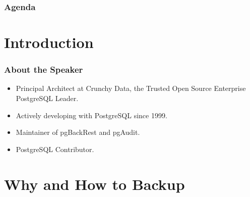 %
\def\mytitle{Backup Best Practices\\with pgBackRest}
\def\mysubject{}
\def\myevent{PGConf.Online 2021}
\def\myauthor{David Steele}
\def\myemail{}
\def\mydate{March 1, 2021}

\def\mysuppressnav{}

\def\mytemplatepath{/template/}


\begin{frame}
    \frametitle{Agenda}
    \tableofcontents
\end{frame}

\section{Introduction}

\begin{frame}
    \frametitle{About the Speaker}

    \begin{itemize}
        \item Principal Architect at Crunchy Data, the Trusted Open Source Enterprise PostgreSQL Leader.
        \item Actively developing with PostgreSQL since 1999.
        \item Maintainer of pgBackRest and pgAudit.
        \item PostgreSQL Contributor.
    \end{itemize}
\end{frame}

\section{Why and How to Backup}


